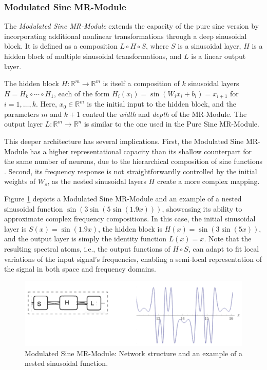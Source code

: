 \subsubsection{Modulated Sine MR-Module}

The \textit{Modulated Sine MR-Module} extends the capacity of the pure sine version by incorporating additional nonlinear transformations through a deep sinusoidal block. It is defined as a composition \( L \circ H \circ S \), where \( S \) is a sinusoidal layer, \( H \) is a hidden block of multiple sinusoidal transformations, and \( L \) is a linear output layer.

The hidden block \( H\!:\!\mathbb{R}^m\!\to\! \mathbb{R}^m \) is itself a composition of \( k \) sinusoidal layers \( H = H_k \circ \cdots \circ H_1 \), each of the form \( H_i(x_i) = \sin\left(W_i x_i + b_i\right) = x_{i+1} \) for \( i = 1, \dots, k \). Here, \( x_0 \in \mathbb{R}^m \) is the initial input to the hidden block, and the parameters \( m \) and \( k + 1 \) control the \textit{width} and \textit{depth} of the MR-Module. The output layer \( L \!:\! \mathbb{R}^m \!\to\! \mathbb{R}^n \) is similar to the one used in the Pure Sine MR-Module.

This deeper architecture has several implications. First, the Modulated Sine MR-Module has a higher representational capacity than its shallow counterpart for the same number of neurons, due to the hierarchical composition of sine functions \citep{novello2022understanding}. Second, its frequency response is not straightforwardly controlled by the initial weights of \( W_s \), as the nested sinusoidal layers \( H \) create a more complex mapping.

Figure \ref{f:modulated} depicts a Modulated Sine MR-Module and an example of a nested sinusoidal function \( \sin\left( 3\sin\left(5\sin(1.9x)\right)\right) \), showcasing its ability to approximate complex frequency compositions. In this case, the initial sinusoidal layer is \( S(x) = \sin(1.9 x) \), the hidden block is \( H(x) = \sin\left(3\sin(5x)\right) \), and the output layer is simply the identity function \( L(x) = x \). Note that the resulting spectral atoms, i.e., the output functions of \( H \circ S \), can adapt to fit local variations of the input signal's frequencies, enabling a semi-local representation of the signal in both space and frequency domains.

\begin{figure}[!h]
\centering
\includegraphics[width=0.9\linewidth]{img/ch4/modulated-sine.png}
\caption{Modulated Sine MR-Module: Network structure and an example of a nested sinusoidal function.}
\label{f:modulated}
\end{figure}

